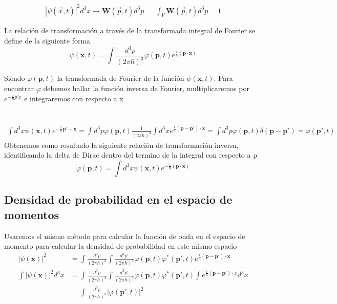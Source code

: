 \documentclass[a4,12pt]{aleph-notas}
\begin{document}
\begin{align*}
    \left\vert \psi (\vec{x},t)\right\vert^2 d^3x \longrightarrow \mathbf{W} (\vec{p},t)d^3p && \int_{V} \mathbf{W}(\vec{p},t)d^3p=1
\end{align*}

La relación de transformación a través de la transformada integral de Fourier se define de la siguiente forma
\begin{equation}\label{TFourier}
    \psi(\textbf{x},t)=\int\frac{d^3p}{(2\pi\hbar)^3}\varphi(\textbf{p},t)e^{\frac{i}{\hbar}(\textbf{p}\cdot\textbf{x})}
\end{equation}

Siendo $\varphi(\textbf{p},t)$ la transformada de Fourier de la función $\psi(\textbf{x},t)$. Para encontrar $\varphi$ debemos hallar la función inversa de Fourier, multiplicaremos por $e^{-\frac{i}{\hbar}p'x}$ e integraremos con respecto a x \\ \\ \\
\begin{align*}
    \int d^3x \psi(\textbf{x},t)e^{-\frac{i}{\hbar}\textbf{p}'-\textbf{x}}=\int d^3p\varphi(\textbf{p},t) \frac{1}{(2\pi\hbar)^3}\int d^3x e^{\frac{i}{\hbar}(\textbf{p}-\textbf{p}')\cdot \textbf{x}}=\int d^3p \varphi(\textbf{p},t) \delta(\textbf{p}-\textbf{p}')=\varphi(\textbf{p}',t)
\end{align*}
Obtenemos como resultado la siguiente relación de transformación inversa, identificando la delta de Dirac dentro del termino de la integral con respecto a p
\begin{equation}\label{IFourier}
    \varphi(\textbf{p},t)=\int d^3x\psi(\textbf{x},t)e^{-\frac{i}{\hbar}(\textbf{p}\cdot\textbf{x})}
\end{equation}

\subsection{Densidad de probabilidad en el espacio de momentos}
Usaremos el mismo método para calcular la función de onda en el espacio de momento para calcular la densidad de probabilidad en este mismo espacio
\begin{align*}
\left\vert \psi(\textbf{x})\right\vert^2&=\int \frac{d^3 p}{(2 \pi \hbar)^3}\int \frac{d^3 p'}{(2 \pi \hbar)^3} \varphi(\textbf{p},t)\varphi^{\ast}(\textbf{p}',t) e^{\frac{i}{\hbar}(\textbf{p}-\textbf{p}')\cdot \textbf{x}}\\
\int \left\vert \psi(\textbf{x})\right\vert^2 d^3 x &= \int \frac{d^3 p}{(2 \pi \hbar)^3}\int \frac{d^3 p'}{(2 \pi \hbar)^3} \varphi(\textbf{p},t)\varphi^{\ast}(\textbf{p}',t)\int e^{\frac{i}{\hbar}(\textbf{p}-\textbf{p}')\cdot x} d^3 x\\
&=\int \frac{d^3 p}{(2 \pi\hbar)^3}\left\vert\varphi(\textbf{p}',t)\right\vert^2
\end{align*}
\end{document}

